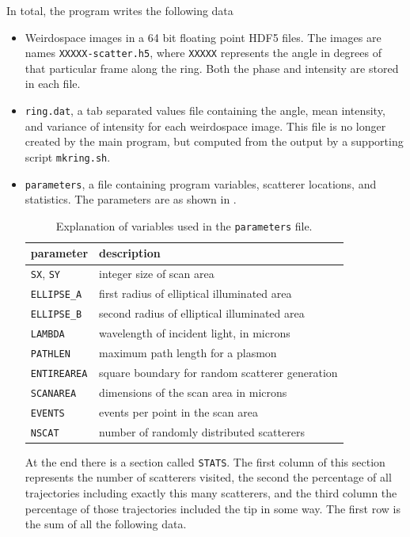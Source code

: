 In total, the program writes the following data
\begin{itemize}
  \item Weirdospace images in a 64 bit floating point HDF5 files.  The images
        are names {\tt XXXXX-scatter.h5}, where {\tt XXXXX} represents the angle
        in degrees of that particular frame along the ring.  Both the phase and
        intensity are stored in each file.
  \item {\tt ring.dat}, a tab separated values file containing the angle,
        mean intensity, and variance of intensity for each weirdospace image.  This
        file is no longer created by the main program, but computed from the output
        by a supporting script {\tt mkring.sh}.
  \item {\tt parameters}, a file containing program variables, scatterer
        locations, and statistics.  The parameters are as shown in .
        \begin{table}
          \begin{center}
            \begin{tabular}{ll}
              \toprule
              parameter          & description                                     \\
              \midrule
              {\tt SX}, {\tt SY} & integer size of scan area                       \\
              {\tt ELLIPSE\_A}   & first radius of elliptical illuminated area     \\
              {\tt ELLIPSE\_B}   & second radius of elliptical illuminated area    \\
              {\tt LAMBDA}       & wavelength of incident light, in microns        \\
              {\tt PATHLEN}      & maximum path length for a plasmon               \\
              {\tt ENTIREAREA}   & square boundary for random scatterer generation \\
              {\tt SCANAREA}     & dimensions of the scan area in microns          \\
              {\tt EVENTS}       & events per point in the scan area               \\
              {\tt NSCAT}        & number of randomly distributed scatterers       \\
              \bottomrule
            \end{tabular}
          \end{center}
          \caption{Explanation of variables used in the {\tt parameters} file.}
          \label{tbl:parameters}
        \end{table}
        At the end there is a section called {\tt STATS}.  The first column of this
        section represents the number of scatterers visited, the second the
        percentage of all trajectories including exactly this many scatterers, and
        the third column the percentage of those trajectories included the tip in
        some way.  The first row is the sum of all the following data.
\end{itemize}

